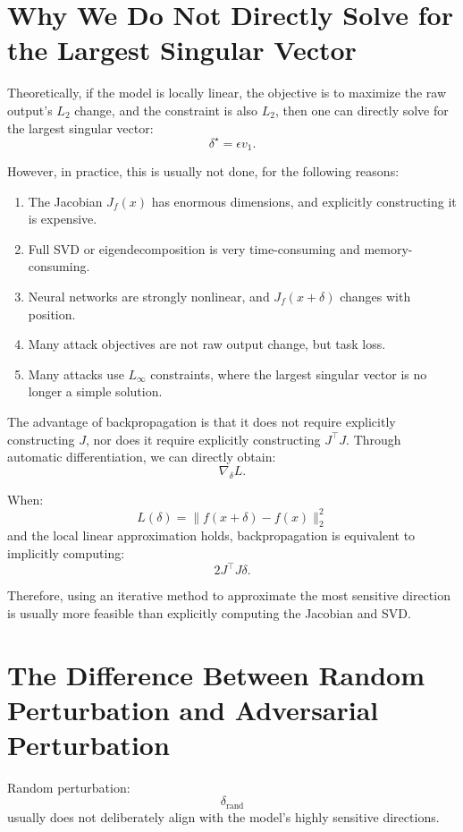 \documentclass{article}
\begin{document}
\section{Why We Do Not Directly Solve for the Largest Singular Vector}

Theoretically, if the model is locally linear, the objective is to maximize the raw output's \(L_2\) change, and the constraint is also \(L_2\), then one can directly solve for the largest singular vector:
\[
\delta^\star=\epsilon v_1.
\]

However, in practice, this is usually not done, for the following reasons:

\begin{enumerate}
    \item The Jacobian \(J_f(x)\) has enormous dimensions, and explicitly constructing it is expensive.
    \item Full SVD or eigendecomposition is very time-consuming and memory-consuming.
    \item Neural networks are strongly nonlinear, and \(J_f(x+\delta)\) changes with position.
    \item Many attack objectives are not raw output change, but task loss.
    \item Many attacks use \(L_\infty\) constraints, where the largest singular vector is no longer a simple solution.
\end{enumerate}

The advantage of backpropagation is that it does not require explicitly constructing \(J\), nor does it require explicitly constructing \(J^\top J\). Through automatic differentiation, we can directly obtain:
\[
\nabla_\delta L.
\]

When:
\[
L(\delta)=\|f(x+\delta)-f(x)\|_2^2
\]
and the local linear approximation holds, backpropagation is equivalent to implicitly computing:
\[
2J^\top J\delta.
\]

Therefore, using an iterative method to approximate the most sensitive direction is usually more feasible than explicitly computing the Jacobian and SVD.

\section{The Difference Between Random Perturbation and Adversarial Perturbation}

Random perturbation:
\[
\delta_{\mathrm{rand}}
\]
usually does not deliberately align with the model's highly sensitive directions.
\end{document}
